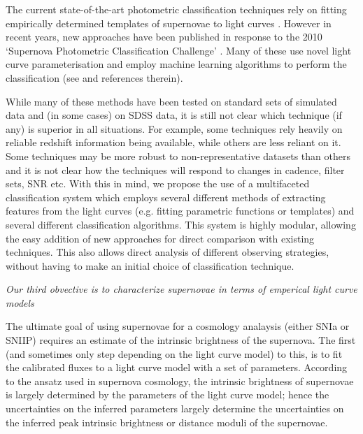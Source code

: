 The current state-of-the-art photometric classification techniques rely on fitting empirically 
determined templates of supernovae to light curves \citep{Jha2007,Guy2007,Sako2011}. However in 
recent years, new approaches have been published in response to the 2010 `Supernova 
Photometric Classification Challenge' \citep{Kessler2010a}. Many of these use novel light curve 
parameterisation and employ machine learning algorithms to perform the classification (see \citet{Kessler2010b} and references therein).

While many of these methods have been tested on standard sets of simulated data and (in some cases) 
on SDSS data, it is still not clear which technique (if any) is superior in all situations. For 
example, some techniques rely heavily on reliable redshift information being available, while others 
are less reliant on it. Some techniques may be more robust to non-representative datasets than 
others and it is not clear how the techniques will respond to changes in cadence, filter sets, SNR 
etc. With this in mind, we propose the use of a multifaceted classification system which employs 
several different methods of extracting features from the light curves (e.g. fitting parametric 
functions or templates) and several different classification algorithms. This system is highly 
modular, allowing the easy addition of new approaches for direct comparison with existing  techniques. This also allows direct analysis of different observing strategies, without having to 
make an initial choice of classification technique. 


{\emph{Our third obvective is to characterize supernovae in terms of emperical
    light curve models}}

The ultimate goal of using supernovae for a cosmology analaysis (either SNIa or SNIIP) requires an estimate of the intrinsic brightness of the supernova. The
first (and sometimes only step depending on the light curve model) to this, is
to fit the calibrated fluxes to a light curve model with a set of parameters.
According to the ansatz used in supernova cosmology, the intrinsic brightness of
 supernovae is largely determined by the parameters of the light curve model; 
 hence the uncertainties on the inferred parameters largely determine the
 uncertainties on the inferred peak intrinsic brightness or distance moduli of the
 supernovae.


